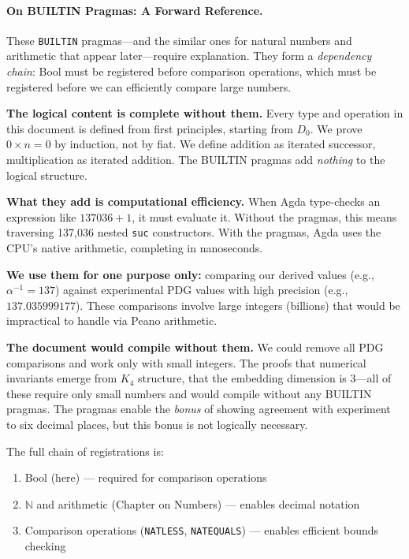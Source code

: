 \documentclass[11pt,a4paper]{book}
\begin{document}
\paragraph{On BUILTIN Pragmas: A Forward Reference.}
These \texttt{BUILTIN} pragmas---and the similar ones for natural numbers and arithmetic 
that appear later---require explanation. They form a \emph{dependency chain}: Bool must 
be registered before comparison operations, which must be registered before we can 
efficiently compare large numbers.

\textbf{The logical content is complete without them.} Every type and operation in this 
document is defined from first principles, starting from $D_0$. We prove $0 \times n = 0$ 
by induction, not by fiat. We define addition as iterated successor, multiplication as 
iterated addition. The BUILTIN pragmas add \emph{nothing} to the logical structure.

\textbf{What they add is computational efficiency.} When Agda type-checks an expression 
like $137036 + 1$, it must evaluate it. Without the pragmas, this means traversing 137,036 
nested \texttt{suc} constructors. With the pragmas, Agda uses the CPU's native arithmetic, 
completing in nanoseconds.

\textbf{We use them for one purpose only:} comparing our derived values (e.g., $\alpha^{-1} = 137$) 
against experimental PDG values with high precision (e.g., $137.035999177$). These comparisons 
involve large integers (billions) that would be impractical to handle via Peano arithmetic.

\textbf{The document would compile without them.} We could remove all PDG comparisons and 
work only with small integers. The proofs that numerical invariants emerge from $K_4$ structure, 
that the embedding dimension is $3$---all of these require only small numbers and would 
compile without any BUILTIN pragmas. The pragmas enable the \emph{bonus} of showing agreement 
with experiment to six decimal places, but this bonus is not logically necessary.

The full chain of registrations is:
\begin{enumerate}
\item Bool (here) --- required for comparison operations
\item $\mathbb{N}$ and arithmetic (Chapter on Numbers) --- enables decimal notation
\item Comparison operations (\texttt{NATLESS}, \texttt{NATEQUALS}) --- enables efficient bounds checking
\end{enumerate}
\end{document}
